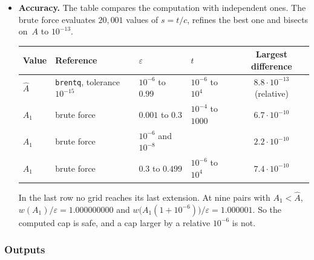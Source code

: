 \documentclass[11pt,a4paper]{article}
\theoremstyle{plain}
\theoremstyle{definition}
\theoremstyle{remark}
\begin{document}
\begin{itemize}
  \item \textbf{Accuracy.} The table compares the computation with independent ones.
    The brute force evaluates $20{,}001$ values of $s = t/c$, refines the best one and bisects on~$A$ to $10^{-13}$.
    \begin{center}
    \small
    \begin{tabular}{@{}llllc@{}}
    \toprule
\rowcolor{headgrey}
    Value & Reference & $\varepsilon$ & $t$ & Largest difference \\
    \midrule
    $\hat A$ & \texttt{brentq}, tolerance $10^{-15}$ & $10^{-6}$ to $0.99$ & $10^{-6}$ to $10^{4}$ & $8.8 \cdot 10^{-13}$ (relative) \\
    $A_1$ & brute force & $0.001$ to $0.3$ & $10^{-4}$ to $1000$ & $6.7 \cdot 10^{-10}$ \\
    $A_1$ & brute force & $10^{-6}$ and $10^{-8}$ & & $2.2 \cdot 10^{-10}$ \\
    $A_1$ & brute force & $0.3$ to $0.499$ & $10^{-6}$ to $10^{4}$ & $7.4 \cdot 10^{-10}$ \\
    \bottomrule
    \end{tabular}
    \end{center}
    In the last row no grid reaches its last extension.
    At nine pairs with $A_1 < \hat A$, $w(A_1)/\varepsilon = 1.000000000$ and $w\bigl(A_1 (1 + 10^{-6})\bigr)/\varepsilon = 1.000001$.
    So the computed cap is safe, and a cap larger by a relative $10^{-6}$ is not.
\end{itemize}

\subsubsection{Outputs}
\label{sec:impl_outputs}
\end{document}
